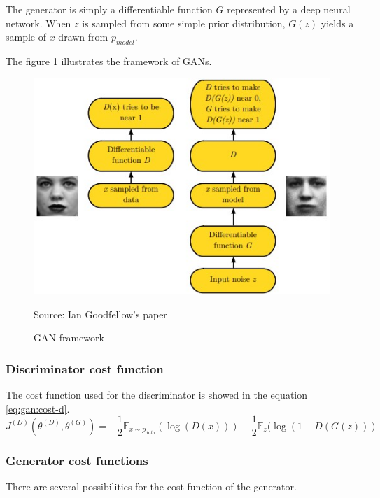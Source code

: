 \documentclass[12pt]{report}
\begin{document}
The generator is simply a differentiable function $G$ represented by a deep neural network.
When $z$ is sampled from some simple prior distribution, $G(z)$ yields a sample of $x$ drawn from $p_{model}$.

The figure \ref{fig:gan-framework} illustrates the framework of GANs.

\begin{figure}[htbp]
    \centering
    \includegraphics[width=\textwidth]{images/nn/architectures/gan-framework.jpg}
    \caption{GAN framework}
    \label{fig:gan-framework}
    Source: Ian Goodfellow's paper \cite{goodfellow_nips_2017}
\end{figure}

\subsubsection{Discriminator cost function}

The cost function used for the discriminator is showed in the equation \ref{eq:gan:cost-d}.
\begin{equation}
    J^{(D)}(\theta^{(D)}, \theta^{(G)}) = -\frac{1}{2}\mathbb{E}_{x \sim p_{data}} (\log (D(x))) - \frac{1}{2} \mathbb{E}_{z} ( \log (1 -D(G(z)))
    \label{eq:gan:cost-d}
\end{equation}

\subsubsection{Generator cost functions}

There are several possibilities for the cost function of the generator.
\end{document}
